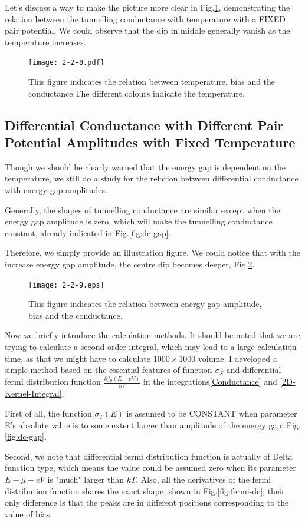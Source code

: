 Let's discuss a way to make the picture more clear in Fig.\ref{fig:3D-dc}, demonstrating the relation between the tunnelling conductance with temperature with a FIXED pair potential. We could observe that the dip in middle generally vanish as the temperature increases.
\begin{figure}[htbp]
\small
\centering
\texttt{[image: 2-2-8.pdf]}
\caption{This figure indicates the relation between temperature, bias and the conductance.The different colours indicate the temperature.}
\label{fig:3D-dc}
\end{figure}

\subsection{Differential Conductance with Different Pair Potential Amplitudes with Fixed Temperature}
Though we should be clearly warned that the energy gap is dependent on the temperature, we still do a study for the relation between differential conductance with energy gap amplitudes.

Generally, the shapes of tunnelling conductance are similar except when the energy gap amplitude is zero, which will make the tunnelling conductance constant, already indicated in Fig.\ref{fig:dc-gap}.

Therefore, we simply provide an illustration figure. We could notice that with the increase energy gap amplitude, the centre dip becomes deeper, Fig.\ref{fig:3D-dc-gap}.
\begin{figure}[htbp]
\small
\centering
\texttt{[image: 2-2-9.eps]}
\caption{This figure indicates the relation between energy gap amplitude, bias and the conductance.}
\label{fig:3D-dc-gap}
\end{figure}


Now we briefly introduce the calculation methods. It should be noted that we are trying to calculate a second order integral, which may lead to a large calculation time, as that we might have to calculate $1000\times1000$ volume. I developed a simple method based on the essential features of function $\sigma_S$ and differential fermi distribution function $\frac{\partial{f_0(E-eV)}}{\partial{V}}$ in the integrations\eqref{Conductance} and \eqref{2D-Kernel-Integral}.

First of all, the function $\sigma_T(E)$ is assumed to be  CONSTANT when parameter E's absolute value is to some extent larger than amplitude of the energy gap, Fig.\ref{fig:dc-gap}.

Second, we note that differential fermi distribution function is actually of Delta function type, which means the value could be assumed zero when its parameter $E-\mu-eV$ is "much" larger than $kT$. Also, all the derivatives of the fermi distribution function shares the exact shape, shown in Fig.\ref{fig:fermi-dc}; their only difference is that the peaks are in different positions corresponding to the value of bias.

